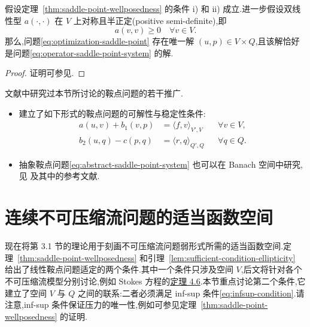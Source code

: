 \begin{theorem}\label{thm:optimization-saddle-point-solution}
假设定理~\ref{thm:saddle-point-wellposedness} 的条件 i) 和 ii) 成立.进一步假设双线性型 $a(\cdot,\cdot)$ 在 $V$ 上对称且半正定(positive semi-definite),即
\[
  a(v,v)\ge0\quad\forall v\in V.
\]
那么,问题\cref{eq:optimization-saddle-point} 存在唯一解 $(u,p)\in V\times Q$,且该解恰好是问题\cref{eq:operator-saddle-point-system} 的解.
\end{theorem}
\begin{proof}
证明可参见\textcite[第 62 页]{GiraultRaviart1986}.
\end{proof}

\begin{note}[若干推广]\label{note:generalizations-saddle-point}
文献中研究过本节所讨论的鞍点问题的若干推广.
\begin{itemize}
  \item \textcite{CiarletHuangZou2003} 建立了如下形式的鞍点问题的可解性与稳定性条件:
  \[
  \begin{aligned}
    a(u,v)+b_1(v,p)&=\langle f,v\rangle_{V',V}
       &&\forall v\in V,\\
    b_2(u,q)-c(p,q)&=\langle r,q\rangle_{Q',Q}
       &&\forall q\in Q.
  \end{aligned}
  \]
  \item 抽象鞍点问题\cref{eq:abstract-saddle-point-system} 也可以在 Banach 空间中研究,见\textcite[第 2.4 章]{ErnGuermond2004} 及其中的参考文献.
\end{itemize}
\end{note}

\section{连续不可压缩流问题的适当函数空间}\label{sec:continuous-flow-function-spaces}

\begin{note}[本节内容]\label{note:continuous-flow-function-spaces-contents}
现在将第 3.1 节的理论用于刻画不可压缩流问题弱形式所需的适当函数空间.定理~\ref{thm:saddle-point-wellposedness} 和引理~\ref{lem:sufficient-condition-ellipticity} 给出了线性鞍点问题适定的两个条件.其中一个条件只涉及空间 $V$,后文将针对各个不可压缩流模型分别讨论,例如 Stokes 方程的\hyperref[thm:stokes-4-6]{定理 4.6}.本节重点讨论第二个条件,它建立了空间 $V$ 与 $Q$ 之间的联系:二者必须满足 inf-sup 条件\cref{eq:infsup-condition}.请注意,inf-sup 条件保证压力的唯一性,例如可参见定理~\ref{thm:saddle-point-wellposedness} 的证明.
\end{note}

